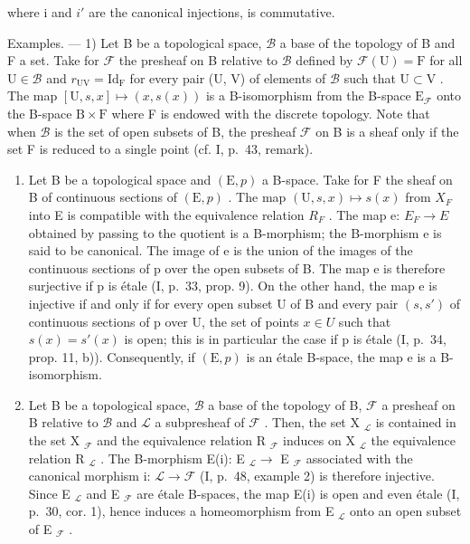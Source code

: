 where i and \(i'\) are the canonical injections, is commutative.

Examples. --- 1) Let B be a topological space, \(\mathcal{B}\) a base of the topology of B and F a set. Take for \(\mathcal{F}\) the presheaf on B relative to \(\mathcal{B}\) defined by \(\mathcal{F}(\mathrm{U}) = \mathrm{F}\) for all \(\mathrm{U} \in \mathcal{B}\) and \(r_{\mathrm{UV}} = \mathrm{Id}_{\mathrm{F}}\) for every pair (U, V) of elements of \(\mathcal{B}\) such that \(\mathrm{U} \subset \mathrm{V}\) . The map \([\mathrm{U}, s, x] \mapsto (x, s(x))\) is a B-isomorphism from the B-space \(\mathrm{E}_{\mathcal{F}}\) onto the B-space \(\mathrm{B} \times \mathrm{F}\) where F is endowed with the discrete topology. Note that when \(\mathcal{B}\) is the set of open subsets of B, the presheaf \(\mathcal{F}\) on B is a sheaf only if the set F is reduced to a single point (cf. I, p.~43, remark).

\begin{enumerate}
\def\labelenumi{\arabic{enumi})}
\setcounter{enumi}{1}
\item
  Let B be a topological space and \((\mathrm{E},p)\) a B-space. Take for F the sheaf on B of continuous sections of \((\mathrm{E},p)\) . The map \((\mathrm{U},s,x)\mapsto s(x)\) from \(X_{F}\) into E is compatible with the equivalence relation \(R_{F}\) . The map e: \(E_{F}\to E\) obtained by passing to the quotient is a B-morphism; the B-morphism e is said to be canonical. The image of e is the union of the images of the continuous sections of p over the open subsets of B. The map e is therefore surjective if p is étale (I, p.~33, prop. 9). On the other hand, the map e is injective if and only if for every open subset U of B and every pair \((s,s')\) of continuous sections of p over U, the set of points \(x\in U\) such that \(s(x)=s'(x)\) is open; this is in particular the case if p is étale (I, p.~34, prop. 11, b)). Consequently, if \((\mathrm{E},p)\) is an étale B-space, the map e is a B-isomorphism.
\item
  Let B be a topological space, \(\mathcal{B}\) a base of the topology of B, \(\mathcal{F}\) a presheaf on B relative to \(\mathcal{B}\) and \(\mathcal{L}\) a subpresheaf of \(\mathcal{F}\) . Then, the set X \(_{\mathcal{L}}\) is contained in the set X \(_{\mathcal{F}}\) and the equivalence relation R \(_{\mathcal{F}}\) induces on X \(_{\mathcal{L}}\) the equivalence relation R \(_{\mathcal{L}}\) . The B-morphism E(i): E \(_{\mathcal{L}} \to\) E \(_{\mathcal{F}}\) associated with the canonical morphism i: \(\mathcal{L} \to \mathcal{F}\) (I, p.~48, example 2) is therefore injective. Since E \(_{\mathcal{L}}\) and E \(_{\mathcal{F}}\) are étale B-spaces, the map E(i) is open and even étale (I, p.~30, cor. 1), hence induces a homeomorphism from E \(_{\mathcal{L}}\) onto an open subset of E \(_{\mathcal{F}}\) .
\end{enumerate}

